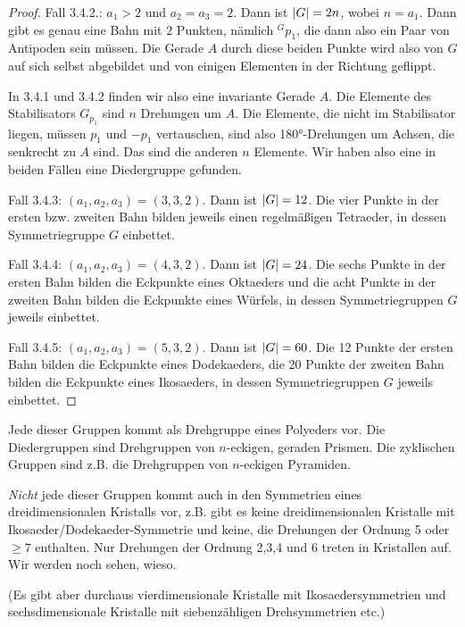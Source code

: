 \begin{proof}
Fall 3.4.2.: $a_1>2$ und $a_2=a_3=2$. Dann ist $\lvert G\rvert=2n$, wobei $n=a_1$. Dann gibt es genau eine Bahn mit $2$ Punkten, nämlich ${^Gp_1}$, die dann also ein Paar von Antipoden sein müssen. Die Gerade $A$ durch diese beiden Punkte wird also von $G$ auf sich selbst abgebildet und von einigen Elementen in der Richtung geflippt.

In 3.4.1 und 3.4.2 finden wir also eine invariante Gerade $A$. Die Elemente des Stabilisators $G_{p_1}$ sind $n$ Drehungen um $A$. Die Elemente, die nicht im Stabilisator liegen, müssen $p_1$ und $-p_1$ vertauschen, sind also 180°-Drehungen um Achsen, die senkrecht zu $A$ sind. Das sind die anderen $n$ Elemente. Wir haben also eine in beiden Fällen eine Diedergruppe gefunden.

Fall 3.4.3: $(a_1,a_2,a_3)=(3,3,2)$. Dann ist $\lvert G\rvert=12$. Die vier Punkte in der ersten bzw. zweiten Bahn bilden jeweils einen regelmäßigen Tetraeder, in dessen Symmetriegruppe $G$ einbettet.

Fall 3.4.4: $(a_1,a_2,a_3)=(4,3,2)$. Dann ist $\lvert G\rvert=24$. Die sechs Punkte in der ersten Bahn bilden die Eckpunkte eines Oktaeders und die acht Punkte in der zweiten Bahn bilden die Eckpunkte eines Würfels, in dessen Symmetriegruppen $G$ jeweils einbettet.

Fall 3.4.5: $(a_1,a_2,a_3)=(5,3,2)$. Dann ist $\lvert G\rvert=60$. Die 12 Punkte der ersten Bahn bilden die Eckpunkte eines Dodekaeders, die 20 Punkte der zweiten Bahn bilden die Eckpunkte eines Ikosaeders, in dessen Symmetriegruppen $G$ jeweils einbettet.
\end{proof}

\begin{remark}
Jede dieser Gruppen kommt als Drehgruppe eines Polyeders vor. Die Diedergruppen sind Drehgruppen von $n$-eckigen, geraden Prismen. Die zyklischen Gruppen sind z.B. die Drehgruppen von $n$-eckigen Pyramiden.
\end{remark}

\begin{remark}
\emph{Nicht} jede dieser Gruppen kommt auch in den Symmetrien eines dreidimensionalen Kristalls vor, z.B. gibt es keine dreidimensionalen Kristalle mit Ikosaeder/Dodekaeder-Symmetrie und keine, die Drehungen der Ordnung 5 oder $\geq 7$ enthalten. Nur Drehungen der Ordnung 2,3,4 und 6 treten in Kristallen auf. Wir werden noch sehen, wieso.

(Es gibt aber durchaus vierdimensionale Kristalle mit Ikosaedersymmetrien und sechsdimensionale Kristalle mit siebenzähligen Drehsymmetrien etc.)
\end{remark}